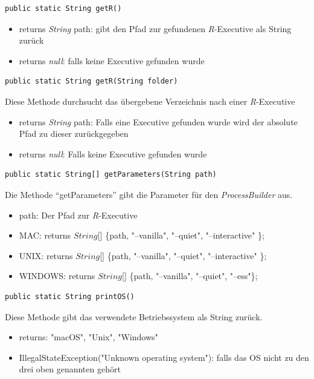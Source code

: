 \documentclass[a4paper, 12pt]{report} %
\begin{document}
 
\lstset{language=Java}
\begin{lstlisting}[frame=single]
public static String getR()
\end{lstlisting}
\begin{itemize}
	\item returns \textit{String} path: gibt den Pfad zur gefundenen \textit{R}-Executive als String zurück
	\item returns \textit{null}: falls keine Executive gefunden wurde
\end{itemize}


\lstset{language=Java}
\begin{lstlisting}[frame=single]
public static String getR(String folder)
\end{lstlisting}
Diese Methode durchsucht das übergebene Verzeichnis nach einer \textit{R}-Executive
\begin{itemize}
	\item returns \textit{String} path: Falls eine Executive gefunden wurde wird der absolute Pfad zu dieser zurückgegeben
	\item returns \textit{null}: Falls keine Executive gefunden wurde
\end{itemize}


\lstset{language=Java}
\begin{lstlisting}[frame=single]
public static String[] getParameters(String path)
\end{lstlisting}
Die Methode "`getParameters"' gibt die Parameter für den \textit{ProcessBuilder} aus.
\begin{itemize}
	\item path: Der Pfad zur \textit{R}-Executive 
	\item MAC: returns $String$[] \{path, "--vanilla", "--quiet", "--interactive" \};
	\item UNIX: returns $String$[] \{path, "--vanilla", "--quiet", "--interactive" \};
	\item WINDOWS: returns $String$[] \{path, "--vanilla", "--quiet", "--ess"\};
\end{itemize}

\lstset{language=Java}
\begin{lstlisting}[frame=single]
public static String printOS()
\end{lstlisting}
Diese Methode gibt das verwendete Betriebssystem als String zurück.
\begin{itemize}
	\item returns: "macOS", "{}Unix", "Windows"
	\item IllegalStateException("{}Unknown operating system"): falls das OS nicht zu den drei oben genannten gehört
\end{itemize}
\end{document}
